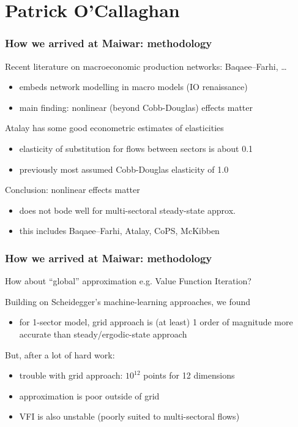 \documentclass[handout,english]{beamer}
\begin{document}
\section{Patrick O'Callaghan}
\begin{frame}
  \frametitle{How we arrived at Maiwar: methodology}
  Recent literature on macroeconomic production networks: Baqaee--Farhi, \dots
  \begin{itemize}
    \item embeds network modelling in macro models (IO renaissance)
    \item main finding: nonlinear (beyond Cobb-Douglas) effects matter
  \end{itemize}
  Atalay has some good econometric estimates of elasticities
  \begin{itemize}
    \item elasticity of substitution for flows between sectors is about 0.1
    \item previously most assumed Cobb-Douglas elasticity of 1.0
  \end{itemize}
  Conclusion: nonlinear effects matter
  \begin{itemize}
    \item {\color{patrickcolor3}
      does not bode well for multi-sectoral steady-state approx.}
    \item this includes Baqaee--Farhi, Atalay, CoPS, McKibben
  \end{itemize}
\end{frame}
\begin{frame}
  \frametitle{How we arrived at Maiwar: methodology}
  How about ``global'' approximation e.g. Value Function Iteration?

  Building on Scheidegger's machine-learning approaches, we found
  \begin{itemize}
    \item for 1-sector model, grid approach is (at least) 1 order of magnitude 
      more accurate than steady/ergodic-state approach
  \end{itemize}
  But, after a lot of hard work:
  \begin{itemize}
    \item trouble with grid approach: $10 ^ {12}$ points for 12 dimensions
    \item approximation is poor outside of grid
    \item VFI is also unstable (poorly suited to multi-sectoral flows)
  \end{itemize}
\end{frame}
\end{document}
